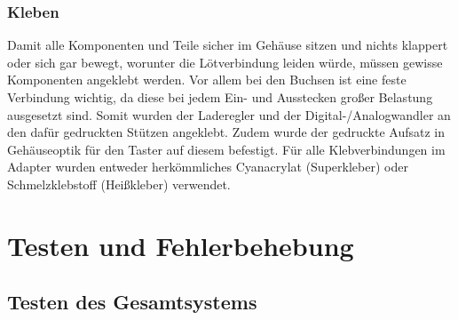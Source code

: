 \documentclass[11pt, twoside]{article}
\begin{document}
\subsubsection{Kleben}
Damit alle Komponenten und Teile sicher im Gehäuse sitzen und nichts klappert oder sich gar bewegt, worunter die Lötverbindung leiden würde, müssen gewisse Komponenten angeklebt werden. Vor allem bei den Buchsen ist eine feste Verbindung wichtig, da diese bei jedem Ein- und Ausstecken großer Belastung ausgesetzt sind. Somit wurden der Laderegler und der Digital-/Analogwandler an den dafür gedruckten Stützen angeklebt. Zudem wurde der gedruckte Aufsatz in Gehäuseoptik für den Taster auf diesem befestigt. Für alle Klebverbindungen im Adapter wurden entweder herkömmliches Cyanacrylat (Superkleber) oder Schmelzklebstoff (Heißkleber) verwendet.

\section{Testen und Fehlerbehebung}
\subsection{Testen des Gesamtsystems}
\end{document}
